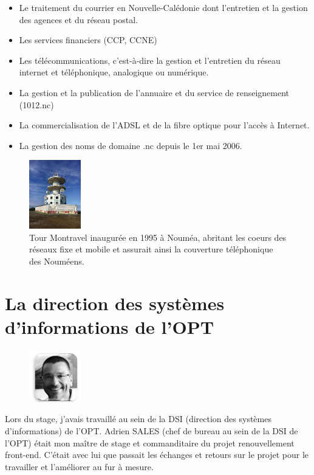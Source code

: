 \documentclass[12pt,a4paper]{report}
\begin{document}
\begin{itemize}
    \item Le traitement du courrier en Nouvelle-Calédonie dont l'entretien et la gestion des agences et du réseau postal.
    \item Les services financiers (CCP, CCNE)
    \item Les télécommunications, c'est-à-dire la gestion et l'entretien du réseau internet et téléphonique, analogique ou numérique.
    \item La gestion et la publication de l'annuaire et du service de renseignement (1012.nc)
    \item La commercialisation de l'ADSL et de la fibre optique pour l'accès à Internet.
    \item La gestion des noms de domaine .nc depuis le 1er mai 2006.
\end{itemize}
\begin{figure}[h] %
    \centering
    \includegraphics[width=0.2\textwidth]{ressources_rapport/tour_montravel.jpg}
    \caption{Tour Montravel inaugurée en 1995 à Nouméa, abritant les coeurs des réseaux fixe et mobile et assurait ainsi la couverture téléphonique des Nouméens.}
\end{figure}
\newpage

\section{La direction des systèmes d'informations de l'OPT}
\begin{figure}[h] %
    \centering
    \includegraphics[width=0.2\textwidth]{ressources_rapport/adrien_sales.jpg}
\end{figure}
Lors du stage, j'avais travaillé au sein de la DSI (direction des systèmes d'informations) de l'OPT. Adrien SALES (chef de bureau au sein de la DSI de l'OPT) était mon maître de stage et commanditaire du projet renouvellement front-end. C'était avec lui que passait les échanges et retours sur le projet pour le travailler et l'améliorer au fur à mesure.
\end{document}
